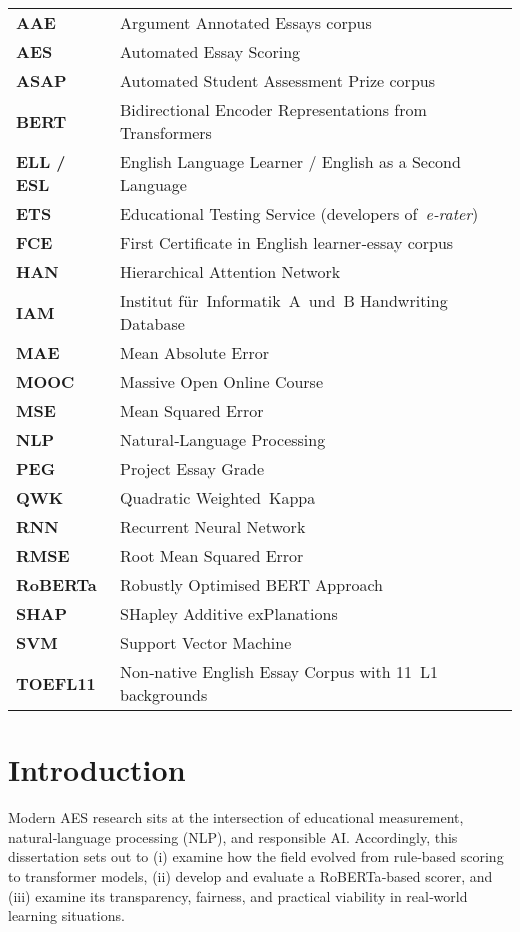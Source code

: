 \documentclass[12pt,a4paper]{report}
\begin{document}
\begin{center}
\renewcommand{\arraystretch}{1.2}
\begin{tabular}{@{}lp{}@{}}
\textbf{AAE}      & Argument Annotated Essays corpus \\
\textbf{AES}      & Automated Essay Scoring \\
\textbf{ASAP}     & Automated Student Assessment Prize corpus \\
\textbf{BERT}     & Bidirectional Encoder Representations from Transformers \\
\textbf{ELL / ESL}& English Language Learner / English as a Second Language \\
\textbf{ETS}      & Educational Testing Service (developers of \textit{e‑rater}) \\
\textbf{FCE}      & First Certificate in English learner‑essay corpus \\
\textbf{HAN}      & Hierarchical Attention Network \\
\textbf{IAM}      & Institut für Informatik A und B Handwriting Database \\
\textbf{MAE}      & Mean Absolute Error \\
\textbf{MOOC}     & Massive Open Online Course \\
\textbf{MSE}      & Mean Squared Error \\
\textbf{NLP}      & Natural‑Language Processing \\
\textbf{PEG}      & Project Essay Grade \\
\textbf{QWK}      & Quadratic Weighted Kappa \\
\textbf{RNN}      & Recurrent Neural Network \\
\textbf{RMSE}     & Root Mean Squared Error \\
\textbf{RoBERTa}  & Robustly Optimised BERT Approach \\
\textbf{SHAP}     & SHapley Additive exPlanations \\
\textbf{SVM}      & Support Vector Machine \\
\textbf{TOEFL11}  & Non‑native English Essay Corpus with 11 L1 backgrounds \\
\end{tabular}
\end{center}

\chapter{Introduction}
Modern AES research sits at the intersection of educational measurement, natural‑language processing (NLP), and responsible AI.  Accordingly, this dissertation sets out to (i) examine how the field evolved from rule‑based scoring to transformer models,  (ii) develop and evaluate a RoBERTa‑based scorer, and (iii) examine its transparency, fairness, and practical viability in real‑world learning situations.
\end{document}
